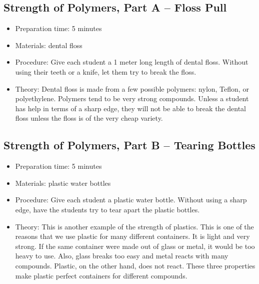 \subsection{Strength of Polymers, Part A – Floss Pull}
\begin{itemize}
\item{Preparation time: 5 minutes}
\item{Materials: dental floss}
\item{Procedure: Give each student a 1 meter long length of dental floss. Without using their teeth or a knife, let them try to break the floss.}
\item{Theory: Dental floss is made from a few possible polymers: nylon, Teflon, or polyethylene. Polymers tend to be very strong compounds. Unless a student has help in terms of a sharp edge, they will not be able to break the dental floss unless the floss is of the very cheap variety.}
\end{itemize}

\subsection{Strength of Polymers, Part B – Tearing Bottles}
\begin{itemize}
\item{Preparation time: 5 minutes}
\item{Materials: plastic water bottles}
\item{Procedure: Give each student a plastic water bottle. Without using a sharp edge, have the students try to tear apart the plastic bottles.}
\item{Theory: This is another example of the strength of plastics. This is one of the reasons that we use plastic for many different containers. It is light and very strong. If the same container were made out of glass or metal, it would be too heavy to use. Also, glass breaks too easy and metal reacts with many compounds. Plastic, on the other hand, does not react. These three properties make plastic perfect containers for different compounds. }
\end{itemize}

